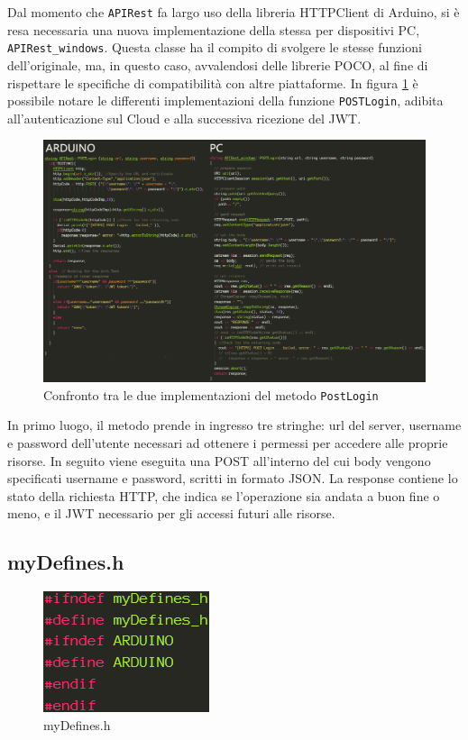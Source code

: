 Dal momento che \texttt{APIRest} fa largo uso della libreria HTTPClient di Arduino, si è resa necessaria una nuova implementazione della stessa per dispositivi PC, \texttt{APIRest\_windows}. Questa classe ha il compito di svolgere le stesse funzioni dell’originale, ma, in questo caso, avvalendosi delle librerie POCO, al fine di rispettare le specifiche di compatibilità con altre piattaforme. In figura \ref{APIRestAW} è possibile notare le differenti implementazioni della funzione \texttt{POSTLogin}, adibita all'autenticazione sul Cloud e alla successiva ricezione del JWT.

\begin{figure}[H]
	\centering
	\includegraphics[width=\linewidth]{pics/APIRestAW}
	\caption{Confronto tra le due implementazioni del metodo \texttt{PostLogin}}
	\label{APIRestAW}
\end{figure}
\newpage

In primo luogo, il metodo prende in ingresso tre stringhe: url del server, username e password dell'utente necessari ad ottenere i permessi per accedere alle proprie risorse. In seguito viene eseguita una POST all'interno del cui body vengono specificati username e password, scritti in formato JSON. La response contiene lo stato della richiesta HTTP, che indica se l'operazione sia andata a buon fine o meno, e il JWT necessario per gli accessi futuri alle risorse.
\subsection{myDefines.h}

\begin{figure}
	\centering
	\includegraphics{pics/myDefines}
	\caption{myDefines.h}
	\label{myDefines}
\end{figure}


